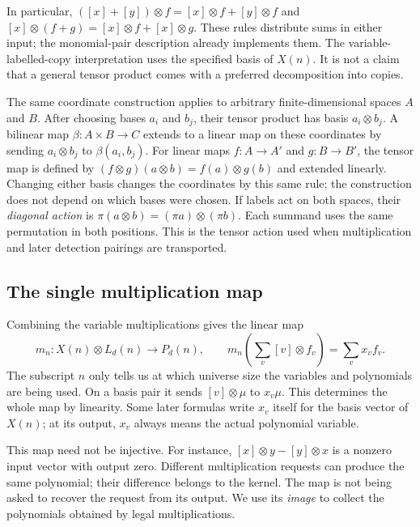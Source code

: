 In particular,
$([x]+[y])\otimes f=[x]\otimes f+[y]\otimes f$ and
$[x]\otimes(f+g)=[x]\otimes f+[x]\otimes g$.
These rules distribute sums in either input; the monomial-pair
description already implements them.
The variable-labelled-copy interpretation uses the specified basis
of $X(n)$. It is not a claim that a general tensor product comes
with a preferred decomposition into copies.

The same coordinate construction applies to arbitrary finite-dimensional
spaces $A$ and $B$. After choosing bases $a_i$ and $b_j$, their tensor
product has basis $a_i\otimes b_j$. A bilinear map $\beta:A\times B\to C$
extends to a linear map on these coordinates by sending
$a_i\otimes b_j$ to $\beta(a_i,b_j)$. For linear maps
$f:A\to A'$ and $g:B\to B'$, the tensor map is defined by
$(f\otimes g)(a\otimes b)=f(a)\otimes g(b)$ and extended linearly.
Changing either basis changes the coordinates by this same rule;
the construction does not depend on which bases were chosen.
If labels act on both spaces, their \emph{diagonal action} is
$\pi(a\otimes b)=(\pi a)\otimes(\pi b)$. Each summand uses the same
permutation in both positions. This is the tensor action used when
multiplication and later detection pairings are transported.

\subsection{The single multiplication map}
Combining the variable multiplications gives the linear map
\[
 \boxed{\quad
 m_n:X(n)\otimes L_d(n)\longrightarrow P_d(n),\qquad
 m_n\!\left(\sum_v[v]\otimes f_v\right)=\sum_v x_vf_v.
 \quad}
\]
The subscript $n$ only tells us at which universe size the variables
and polynomials are being used. On a basis pair it sends
$[v]\otimes\mu$ to $x_v\mu$.
This determines the whole map by linearity.
Some later formulas write $x_v$ itself for the basis vector of $X(n)$;
at its output, $x_v$ always means the actual polynomial variable.

This map need not be injective. For instance,
$[x]\otimes y-[y]\otimes x$ is a nonzero input vector with output zero.
Different multiplication requests can produce the same polynomial;
their difference belongs to the kernel.
The map is not being asked to recover the request from its output.
We use its \emph{image} to collect the polynomials obtained by legal
multiplications.

